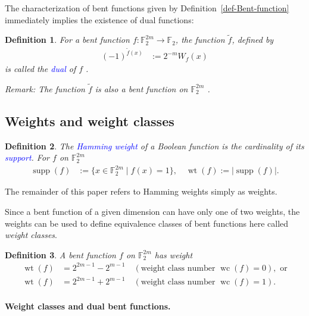 \documentclass[12pt,a4paper]{article}
\newcommand{\mb}[1]{\mathbb{#1}}
\newcommand{\F}{\mb{F}}
\newcommand{\abs}[1]{\left| #1 \right|}
\newcommand{\To}{\rightarrow}
\newcommand{\Emph}[1]{\emph{\textcolor{blue}{#1}}}
\newcommand{\Cay}[1]{\operatorname{Cay}\left(#1\right)}
\newcommand{\dual}[1]{\widetilde{#1}}
\newcommand{\support}[1]{\operatorname{supp}\left(#1\right)}
\newcommand{\weight}[1]{\operatorname{wt}\left(#1\right)}
\newcommand{\weightclass}[1]{\operatorname{wc}\left(#1\right)}
\newtheorem{Definition}{Definition}
\begin{document}
The characterization of bent functions given by Definition~\ref{def-Bent-function} immediately
implies the existence of dual functions:
\begin{Definition}
\label{def-dual-Bent-function}
For a bent function $f : \F_2^{2m} \To \F_2$, the function $\dual{f}$, defined by
\begin{align*}
(-1)^{\dual{f}(x)} &:= 2^{-m} W_f(x)
\end{align*}
is called the \Emph{dual} of $f$ \cite{CarDPS10self}.

Remark: The function $\dual{f}$ is also a bent function on $\F_2^{2m}$ \cite[p. 301]{Rot76}.
\end{Definition}

\subsection{Weights and weight classes}
\begin{Definition}
\label{def-weight}
The \Emph{Hamming weight} of a Boolean function is the cardinality of its \Emph{support}.
For $f$ on $\F_2^{2m}$
\begin{align*}
\support{f} &:= \{x \in \F_2^{2m} \mid f(x)=1 \}, \quad \weight{f} := \abs{ \support{f} }.
\end{align*}
\end{Definition}

The remainder of this paper refers to Hamming weights simply as weights.

Since a bent function of a given dimension can have only one of two weights,
the weights can be used to define equivalence classes of bent functions %
here called \emph{weight classes}.
\begin{Definition}
\label{def-weight-class}
A bent function $f$ on $\F_2^{2m}$ has weight \cite[Theorem 6.2.10]{Dil74}
\begin{align*}
\weight{f} &= 2^{2 m - 1} - 2^{m-1} \quad (\text{weight class number~} \weightclass{f}=0),
\text{~or}
\\
\weight{f} &= 2^{2 m - 1} + 2^{m-1} \quad (\text{weight class number~} \weightclass{f}=1).
\end{align*}
\end{Definition}

\paragraph*{Weight classes and dual bent functions.}
\end{document}

